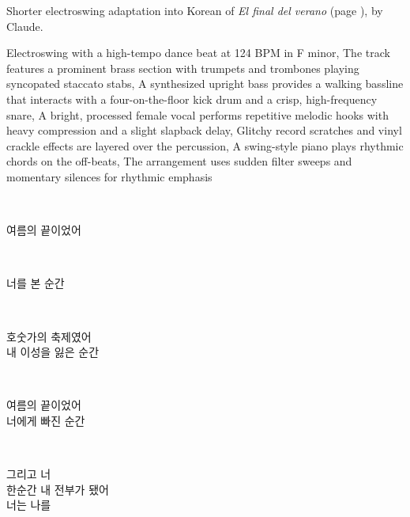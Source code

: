 
\begin{notes}
Shorter electroswing adaptation into Korean of \emph{El final del verano} (page \pageref{sec:verano}), by Claude.
\end{notes}
\begin{style}
Electroswing with a high-tempo dance beat at 124 BPM in F minor, The track features a prominent brass section with trumpets and trombones playing syncopated staccato stabs, A synthesized upright bass provides a walking bassline that interacts with a four-on-the-floor kick drum and a crisp, high-frequency snare, A bright, processed female vocal performs repetitive melodic hooks with heavy compression and a slight slapback delay, Glitchy record scratches and vinyl crackle effects are layered over the percussion, A swing-style piano plays rhythmic chords on the off-beats, The arrangement uses sudden filter sweeps and momentary silences for rhythmic emphasis
\end{style}
\begin{lyrics}
\\
\begin{korean}
여름의 끝이었어\\
\end{korean}
\\
\begin{korean}
너를 본 순간\\
\end{korean}
\\
\begin{korean}
호숫가의 축제였어\\
내 이성을 잃은 순간
\end{korean}

\\
\begin{korean}
여름의 끝이었어\\
너에게 빠진 순간
\end{korean}

\\
\begin{korean}
그리고 너\\
한순간 내 전부가 됐어\\
너는 나를
\end{korean}
\end{lyrics}
